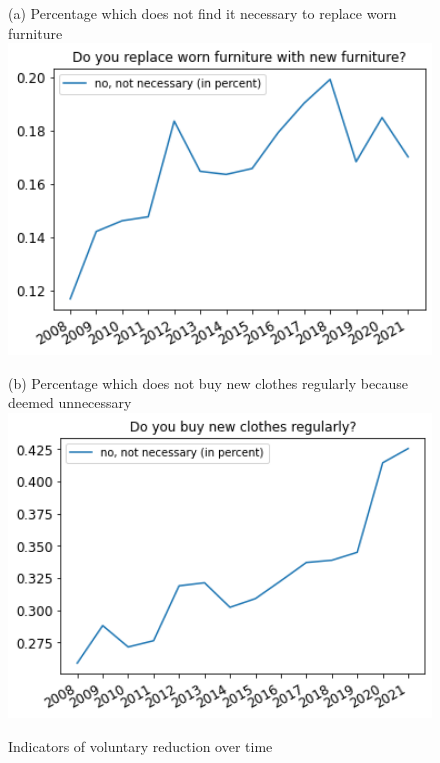 \documentclass[12pt]{article}
\begin{document}
\begin{figure}[h!!]
	\centering	
	\caption{Indicators of voluntary reduction over time}\label{fig:evolution_notNecessary}	
	\begin{minipage}[h!!]{0.32\textwidth}  
		\centering\footnotesize{(a) Percentage which does not find it necessary to replace worn furniture}
		\includegraphics[width=1\textwidth]{../codding_data/results/liss/total_share_notnecessary_ci307.png}
	\end{minipage}
	\begin{minipage}[h!!]{0.32\textwidth}
		\centering\footnotesize{(b) Percentage which does not buy new clothes regularly because deemed unnecessary}
		\includegraphics[width=1\textwidth]{../codding_data/results/liss/total_share_notnecessary_ci306.png}

\end{minipage}
\end{figure}
\end{document}
